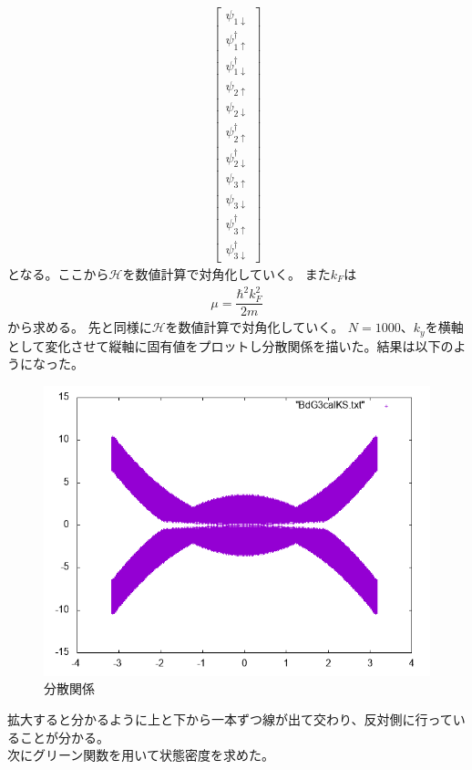 \documentclass{jarticle}
\begin{document}
\begin{align}
\begin{bmatrix}
\psi_{1\downarrow} \\ 
\psi_{1\uparrow}^\dagger \\ 
\psi_{1\downarrow}^\dagger \\ 
\psi_{2\uparrow} \\ 
\psi_{2\downarrow} \\ 
\psi_{2\uparrow}^\dagger \\ 
\psi_{2\downarrow}^\dagger \\ 
\psi_{3\uparrow} \\ 
\psi_{3\downarrow} \\ 
\psi_{3\uparrow}^\dagger \\ 
\psi_{3\downarrow}^\dagger
\end{bmatrix} 
\end{align}
となる。ここから$\mathcal{H}$を数値計算で対角化していく。
また$k_{F}$は
\begin{align}
\mu=\dfrac{\hbar^{2}k_F^{2}}{2m}
\end{align}
から求める。
先と同様に$\mathcal{H}$を数値計算で対角化していく。
$N=1000$、$k_y$を横軸として変化させて縦軸に固有値をプロットし分散関係を描いた。結果は以下のようになった。\\
\begin{figure}[H]
	\centering
	\includegraphics[scale=0.7]{BdG3calKS.png}
	\caption{分散関係}
		\label{3ek}
\end{figure}
拡大すると分かるように上と下から一本ずつ線が出て交わり、反対側に行っていることが分かる。\\
次にグリーン関数を用いて状態密度を求めた。
\end{document}
